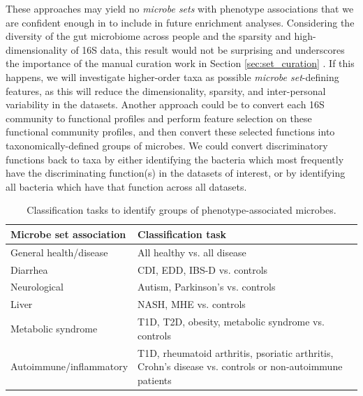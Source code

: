 \documentclass[12pt]{article}
\begin{document}
These approaches may yield no \textit{microbe sets} with phenotype associations
that we are confident enough in to include in future enrichment analyses.
Considering the diversity of the gut microbiome across people and the
sparsity and high-dimensionality of 16S data, 
this result would not be surprising and underscores the importance of the
manual curation work in Section \ref{sec:set_curation} \cite{knights-biomarkers-2011, wang-pval_method-2016}.
If this happens, we will investigate higher-order taxa as possible \textit{microbe set}-defining features,
as this will reduce the dimensionality, sparsity, and inter-personal 
variability in the datasets.
Another approach could be to convert each 16S community to functional profiles \cite{langille-picrust-2013}
and perform feature selection on these functional community profiles, and then
convert these selected functions into taxonomically-defined groups of microbes. 
We could convert discriminatory functions back to taxa
by either identifying the bacteria which most frequently have
the discriminating function(s) in the datasets of interest, or by identifying all bacteria which have that function across all datasets.
{
\renewcommand{\arraystretch}{1.2}
\begin{table}
\begin{center}
\begin{tabular}{ m{6cm} m{10cm} }
	\hline
	\textbf{Microbe set association} & \textbf{Classification task} \\
	\hline
	General health/disease & All healthy vs. all disease \\
	Diarrhea & CDI, EDD, IBS-D vs. controls \\
	Neurological & Autism, Parkinson's vs. controls \\
	Liver & NASH, MHE vs. controls\\
	Metabolic syndrome & T1D, T2D, obesity, metabolic syndrome vs. 
	controls \\
	Autoimmune/inflammatory & T1D, rheumatoid arthritis, psoriatic arthritis, Crohn's disease 
	vs. controls or non-autoimmune patients \\
	\hline
\end{tabular}
\caption{Classification tasks to identify groups of phenotype-associated microbes.}\label{tab:classifications}
\end{center}
\end{table}
}
\end{document}
